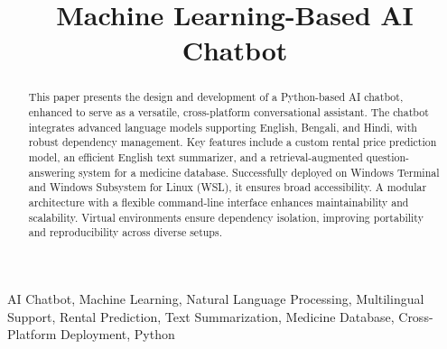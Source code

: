 \documentclass[a4paper,10pt,conference]{IEEEtran}
\begin{document}
\title{\textbf{Machine Learning-Based AI Chatbot}}

\author{
}

\maketitle

\begin{abstract}
This paper presents the design and development of a Python-based AI chatbot, enhanced to serve as a versatile, cross-platform conversational assistant. The chatbot integrates advanced language models supporting English, Bengali, and Hindi, with robust dependency management. Key features include a custom rental price prediction model, an efficient English text summarizer, and a retrieval-augmented question-answering system for a medicine database. Successfully deployed on Windows Terminal and Windows Subsystem for Linux (WSL), it ensures broad accessibility. A modular architecture with a flexible command-line interface enhances maintainability and scalability. Virtual environments ensure dependency isolation, improving portability and reproducibility across diverse setups.
\end{abstract}

\begin{IEEEkeywords}
AI Chatbot, Machine Learning, Natural Language Processing, Multilingual Support, Rental Prediction, Text Summarization, Medicine Database, Cross-Platform Deployment, Python
\end{IEEEkeywords}
\end{document}
